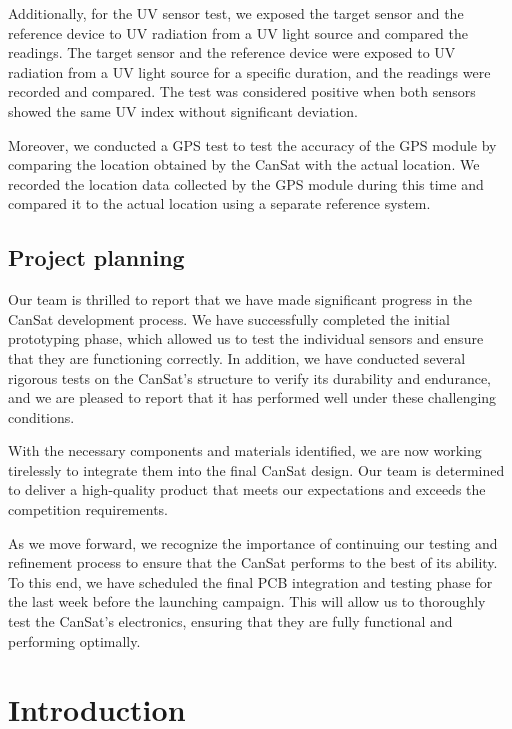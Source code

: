 \documentclass[11pt]{article}
\begin{document}
Additionally, for the UV sensor test, we exposed the target sensor and the reference device to UV radiation from a UV light source and compared the readings. The target sensor and the reference device were exposed to UV radiation from a UV light source for a specific duration, and the readings were recorded and compared. The test was considered positive when both sensors showed the same UV index without significant deviation.

Moreover, we conducted a GPS test to test the accuracy of the GPS module by comparing the location obtained by the CanSat with the actual location. We recorded the location data collected by the GPS module during this time and compared it to the actual location using a separate reference system.


\subsection*{Project planning}

Our team is thrilled to report that we have made significant progress in the CanSat development process. We have successfully completed the initial prototyping phase, which allowed us to test the individual sensors and ensure that they are functioning correctly. In addition, we have conducted several rigorous tests on the CanSat's structure to verify its durability and endurance, and we are pleased to report that it has performed well under these challenging conditions.

With the necessary components and materials identified, we are now working tirelessly to integrate them into the final CanSat design. Our team is determined to deliver a high-quality product that meets our expectations and exceeds the competition requirements.

As we move forward, we recognize the importance of continuing our testing and refinement process to ensure that the CanSat performs to the best of its ability. To this end, we have scheduled the final PCB integration and testing phase for the last week before the launching campaign. This will allow us to thoroughly test the CanSat's electronics, ensuring that they are fully functional and performing optimally.




\section{Introduction}
\end{document}
